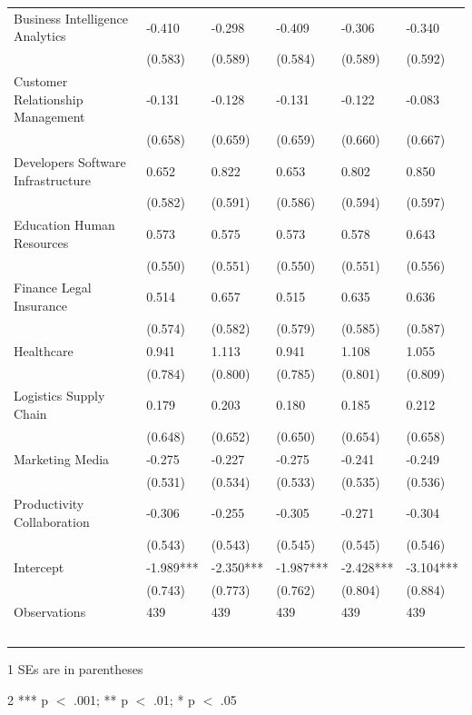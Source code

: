 \documentclass[12pt]{article}
\begin{document}
\begin{table}[!ht]
\begin{tabular}{llllll}
        Business Intelligence Analytics & -0.410 & -0.298 & -0.409 & -0.306 & -0.340 \\
         & (0.583) & (0.589) & (0.584) & (0.589) & (0.592) \\
        Customer Relationship Management & -0.131 & -0.128 & -0.131 & -0.122 & -0.083 \\
         & (0.658) & (0.659) & (0.659) & (0.660) & (0.667) \\
        Developers Software Infrastructure & 0.652 & 0.822 & 0.653 & 0.802 & 0.850 \\
         & (0.582) & (0.591) & (0.586) & (0.594) & (0.597) \\
        Education Human Resources & 0.573 & 0.575 & 0.573 & 0.578 & 0.643 \\
         & (0.550) & (0.551) & (0.550) & (0.551) & (0.556) \\
        Finance Legal Insurance & 0.514 & 0.657 & 0.515 & 0.635 & 0.636 \\
         & (0.574) & (0.582) & (0.579) & (0.585) & (0.587) \\
        Healthcare & 0.941 & 1.113 & 0.941 & 1.108 & 1.055 \\
         & (0.784) & (0.800) & (0.785) & (0.801) & (0.809) \\
        Logistics Supply Chain & 0.179 & 0.203 & 0.180 & 0.185 & 0.212 \\
         & (0.648) & (0.652) & (0.650) & (0.654) & (0.658) \\
        Marketing Media & -0.275 & -0.227 & -0.275 & -0.241 & -0.249 \\
         & (0.531) & (0.534) & (0.533) & (0.535) & (0.536) \\
        Productivity Collaboration & -0.306 & -0.255 & -0.305 & -0.271 & -0.304 \\
         & (0.543) & (0.543) & (0.545) & (0.545) & (0.546) \\

        Intercept & -1.989*** & -2.350*** & -1.987*** & -2.428*** & -3.104*** \\
         & (0.743) & (0.773) & (0.762) & (0.804) & (0.884) \\
        Observations  & 439 & 439 & 439 & 439 & 439 \\
        ~ & ~ & ~ & ~ & ~ & ~ \\
        \midrule
    \end{tabular}
    \begin{tablenotes}
      \item[1] SEs are in parentheses
      \item[2] *** p $<$ .001; ** p $<$ .01; * p $<$ .05
\end{tablenotes}
  \label{table7}
\end{table}
\end{document}
